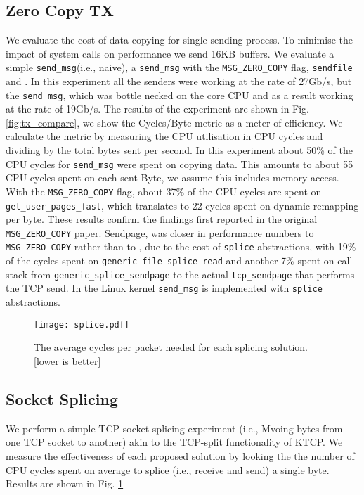 \subsection{Zero Copy TX}
We evaluate the cost of data copying for single sending process. To minimise the impact of system calls on performance we send 16KB buffers. We evaluate a simple \texttt{send\_msg}(i.e., naive), a \texttt{send\_msg} with the \texttt{MSG\_ZERO\_COPY} flag, \texttt{sendfile} and \oursys. In this experiment all the senders were working at the rate of 27Gb/s, but the \texttt{send\_msg}, which was bottle necked on the core CPU and as a result working at the rate of 19Gb/s. The results of the experiment are shown in Fig. \ref{fig:tx_compare}, we show the Cycles/Byte metric as a meter of efficiency. We calculate the metric by measuring the CPU utilisation in CPU cycles and dividing by the total bytes sent per second. In this experiment about 50\% of the CPU cycles for \texttt{send\_msg} were spent on copying data. This amounts to about 55 CPU cycles spent on each sent Byte, we assume this includes memory access. With the \texttt{MSG\_ZERO\_COPY} flag, about 37\% of the CPU cycles are spent on \texttt{get\_user\_pages\_fast}, which translates to 22 cycles spent on dynamic remapping per byte. These results confirm the findings first reported in the original \texttt{MSG\_ZERO\_COPY} paper\cite{desendmsg}. Sendpage, was closer in performance numbers to \texttt{MSG\_ZERO\_COPY} rather than to \oursys, due to the cost of \texttt{splice} abstractions, with 19\% of the cycles spent on \texttt{generic\_file\_splice\_read} and another 7\% spent on call stack from \texttt{generic\_splice\_sendpage} to the actual \texttt{tcp\_sendpage} that performs the TCP send. In the Linux kernel \texttt{send\_msg} is implemented with \texttt{splice} abstractions.

\begin{figure}[t]
    \centering
    \texttt{[image: splice.pdf]}
    \caption{The average cycles per packet needed for each splicing solution. [lower is better]}
    \label{fig:cyc_byte}
\end{figure}

\subsection{Socket Splicing}
We perform a simple TCP socket splicing experiment (i.e., Mvoing bytes from one TCP socket to another) akin to the TCP-split functionality of KTCP. We measure the effectiveness of each proposed solution by looking the the number of CPU cycles spent on average to splice (i.e., receive and send) a single byte. Results are shown in Fig. \ref{fig:cyc_byte}


